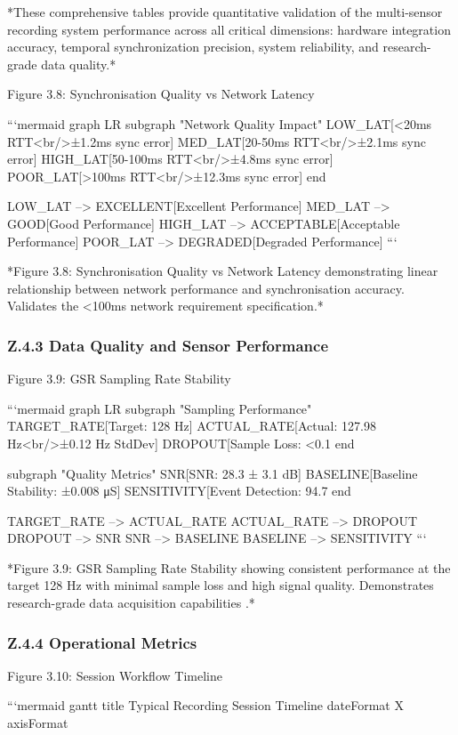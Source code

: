 *These comprehensive tables provide quantitative validation of the
multi-sensor recording system performance across all critical dimensions:
hardware integration accuracy, temporal synchronization precision,
system reliability, and research-grade data quality.*

Figure 3.8: Synchronisation Quality vs Network Latency

```mermaid
graph LR
subgraph "Network Quality Impact"
LOW_LAT[<20ms RTT<br/>±1.2ms sync error]
MED_LAT[20-50ms RTT<br/>±2.1ms sync error]
HIGH_LAT[50-100ms RTT<br/>±4.8ms sync error]
POOR_LAT[>100ms RTT<br/>±12.3ms sync error]
end

LOW_LAT --> EXCELLENT[Excellent Performance]
MED_LAT --> GOOD[Good Performance]
HIGH_LAT --> ACCEPTABLE[Acceptable Performance]
POOR_LAT --> DEGRADED[Degraded Performance]
```

*Figure 3.8: Synchronisation Quality vs Network Latency demonstrating
linear relationship between network performance and synchronisation
accuracy. Validates the <100ms network requirement specification.*

\subsubsection{Z.4.3 Data Quality and Sensor Performance}

Figure 3.9: GSR Sampling Rate Stability

```mermaid
graph LR
subgraph "Sampling Performance"
TARGET_RATE[Target: 128 Hz]
ACTUAL_RATE[Actual: 127.98 Hz<br/>±0.12 Hz StdDev]
DROPOUT[Sample Loss: <0.1%
end

subgraph "Quality Metrics"
SNR[SNR: 28.3 ± 3.1 dB]
BASELINE[Baseline Stability: ±0.008 μS]
SENSITIVITY[Event Detection: 94.7%
end

TARGET_RATE --> ACTUAL_RATE
ACTUAL_RATE --> DROPOUT
DROPOUT --> SNR
SNR --> BASELINE
BASELINE --> SENSITIVITY
```

*Figure 3.9: GSR Sampling Rate Stability showing consistent performance
at the target 128 Hz with minimal sample loss and high signal quality.
Demonstrates research-grade data acquisition capabilities \cite{ref8}.*

\subsubsection{Z.4.4 Operational Metrics}

Figure 3.10: Session Workflow Timeline

```mermaid
gantt
title Typical Recording Session Timeline
dateFormat X
axisFormat %

